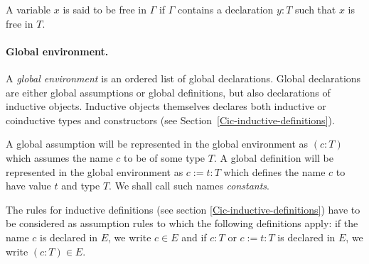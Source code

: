 

A variable $x$ is said to be free in $\Gamma$ if $\Gamma$ contains a
declaration $y:T$ such that $x$ is free in $T$.

\paragraph[Global environment.]{Global environment.}

A {\em global environment} is an ordered list of global declarations.
Global declarations are either global assumptions or global
definitions, but also declarations of inductive objects. Inductive objects themselves declares both inductive or coinductive types and constructors
(see Section~\ref{Cic-inductive-definitions}).

A global assumption will be represented in the global environment as
$(c:T)$ which assumes the name $c$ to be of some type $T$.
A global definition will
be represented in the global environment as $c:=t:T$ which defines
the name $c$ to have value $t$ and type $T$.
We shall call such names {\em constants}.

The rules for inductive definitions (see section
\ref{Cic-inductive-definitions}) have to be considered as assumption
rules to which the following definitions apply: if the name $c$ is
declared in $E$, we write $c \in E$ and if $c:T$ or $c:=t:T$ is
declared in $E$, we write $(c : T) \in E$.

